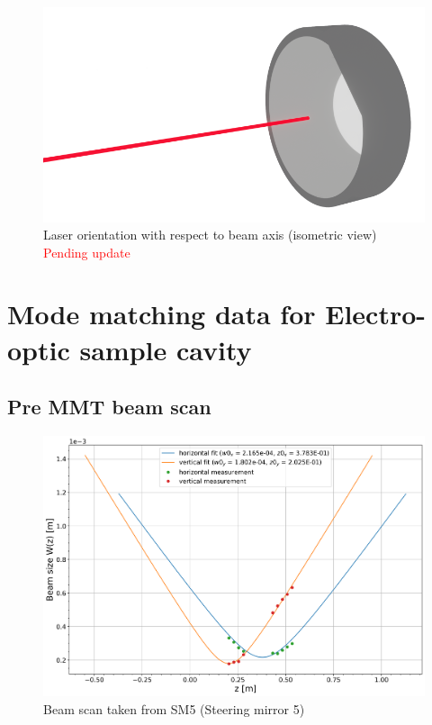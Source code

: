\begin{figure}[H]
\includegraphics[width=\textwidth]{figs/ALGAAS/laser_mirror_test2.png}
\caption{Laser orientation with respect to beam axis (isometric view) \textcolor{red}{Pending update}}
\label{fig:algaas_beam_orientation_blender}
\end{figure}


\section{Mode matching data for Electro-optic sample cavity}
\subsection{Pre MMT beam scan}

\begin{figure}[H]
\includegraphics[width=\textwidth]{figs/ALGAAS/beamscans/12_18_2020_preMMT.png}
\caption{Beam scan taken from SM5 (Steering mirror 5)}
\label{fig:macor_mount_design}
\end{figure}



